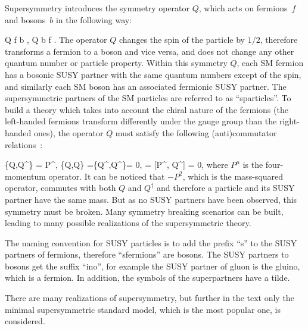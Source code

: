 
Supersymmetry introduces the symmetry operator $Q$, which acts on fermions~$f$ and bosons~$b$ in the following way:

{
Q \mid f \rangle \to \mid b \rangle ,
}
{ 
Q \mid b \rangle \to \mid f \rangle .
}
The operator $Q$ changes the spin of the particle by $1/2$, therefore transforms a fermion to a boson and vice versa, and does not change any other quantum number or particle property. Within this symmetry $Q$, each SM fermion has a bosonic SUSY partner with the same quantum numbers except of the spin, and similarly each SM boson has an associated fermionic SUSY partner. The supersymmetric partners of the SM particles are referred to as ``sparticles''. To build a theory which takes into account the chiral nature of the fermions (the left-handed fermions transform differently under the gauge group than the right-handed ones), the operator $Q$ must satisfy the following (anti)commutator relations~\cite{Haag:1974qh, Coleman:1967ad}:

{
\{Q,Q^{\dagger}\} = P^{\mu}, \; \{Q,Q\} =\{Q^{\dagger},Q^{\dagger}\}= 0, \; [P^{\mu}, Q] = [P^{\mu}, Q^{\dagger}] = 0,
}
where $P^{\mu}$ is the four-momentum operator. It can be noticed that $-P^{2}$, which is the mass-squared operator, commutes with both $Q$ and $Q^{\dagger}$ and therefore a particle and its SUSY partner have the same mass. But as no SUSY partners have been observed, this symmetry must be broken. Many symmetry breaking scenarios can be built, leading to many possible realizations of the supersymmetric theory. 

The naming convention for SUSY particles is to add the prefix ``s'' to the SUSY partners of fermions, therefore ``sfermions'' are bosons. The SUSY partners to bosons get the suffix ``ino'', for example the SUSY partner of gluon is the gluino, which is a fermion. In addition, the symbols of the superpartners have a tilde.

There are many realizations of supersymmetry, but further in the text only the minimal supersymmetric standard model, which is the most popular one, is considered.


